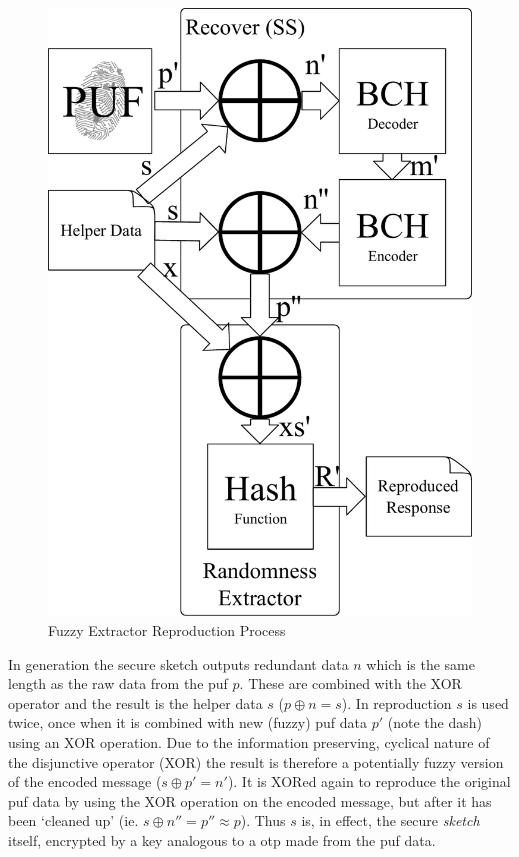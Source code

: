 \begin{figure}
  \centering
  \includegraphics[scale=0.7]{images/reproduction}
  \caption{Fuzzy Extractor Reproduction Process}
  \label{fig:reproduction}
\end{figure}

In generation the secure sketch outputs redundant data $n$ which is the
same length as the raw data from the puf $p$. These are combined with the
XOR operator and the result is the helper data $s$ ($p \oplus n = s$).
In reproduction $s$ is used twice,
once when it is combined with new (fuzzy) \gls{puf} data $p'$ (note the dash)
using an XOR operation.
Due to the information preserving, cyclical nature of the disjunctive
operator (XOR) the result is therefore a potentially fuzzy version of the encoded message
($s \oplus p' = n'$).
It is XORed again to reproduce the original \gls{puf}
data by using the XOR operation on the encoded message, but after it has been
`cleaned up' (ie. $s \oplus n'' = p'' \approx p$).
Thus $s$ is, in effect, the secure \emph{sketch} itself, encrypted by a key analogous
to a \gls{otp} made from the \gls{puf} data.

